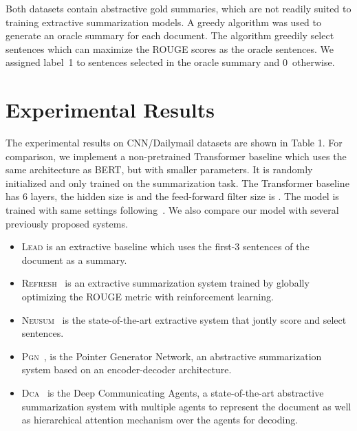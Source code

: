 \documentclass[11pt,a4paper]{article}
\begin{document}
    
    Both datasets contain abstractive gold summaries, which are not
    readily suited to training extractive summarization models. A greedy
    algorithm was used to
    generate an oracle summary for each document. The algorithm
    greedily select sentences which can maximize the ROUGE scores as the oracle sentences.
 We assigned label~1 to sentences selected in the oracle
    summary and 0~otherwise.
    



    
    
    
    \section{Experimental Results}
    The experimental results on CNN/Dailymail datasets are shown in Table 1.
            For comparison, we implement a non-pretrained Transformer baseline which uses the same architecture as BERT, but with smaller parameters. It is randomly initialized and only trained on the summarization task. The Transformer baseline has 6 layers, the hidden size is  and the feed-forward filter size is . The model is trained with same settings following~\citet{vaswani2017attention}.   
    We also compare our model with several previously proposed systems.        

        
    \begin{itemize}
        \item \textsc{Lead} is an extractive baseline which uses the first-3 sentences of the document as a summary.
        
        \item  \textsc{Refresh}~\citep{narayan2018ranking} is an extractive
        summarization system trained by globally optimizing the ROUGE
        metric with reinforcement learning.  
        
        \item \textsc{Neusum}~\citep{zhou2018neural} is the state-of-the-art extractive system that jontly score and select sentences.
        \item  
        \textsc{Pgn}~\citep{see-acl17}, is the Pointer Generator Network, an abstractive summarization system based
        on an encoder-decoder architecture.  
        
        \item \textsc{Dca}~\citep{celikyilmaz2018deep} is the Deep Communicating Agents, a
        state-of-the-art abstractive summarization system with 
        multiple agents  to represent the document as well as
        hierarchical attention mechanism over the agents for decoding.
    \end{itemize}   
\end{document}
